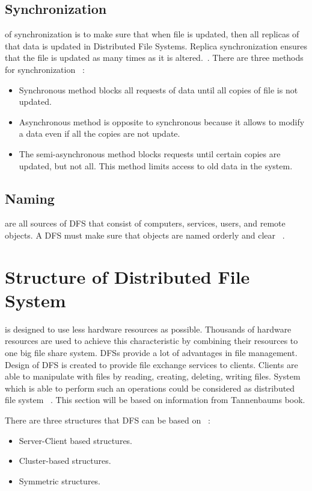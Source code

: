 \documentclass[a4paper,12pt,fleqn]{article}
\begin{document}
\subsection{Synchronization}

 of synchronization is to make sure that when file is updated, then all replicas of that data is updated in Distributed File Systems. Replica synchronization ensures that the file is updated as many times as it is altered.~\cite{vini2015novel}. There are three methods for synchronization ~\cite{depardon2013analysis}:
\begin{itemize}
\item Synchronous method blocks all requests of data until all copies of file is not updated.
\item Asynchronous method is opposite to synchronous because it allows to modify a data even if all the copies are not update.
\item The semi-asynchronous method blocks requests until certain copies are updated, but not all. This method limits access to old data in the system.
\end{itemize}

\subsection{Naming}

 are all sources of DFS that consist of computers, services, users, and remote objects. A DFS must make sure that objects are named orderly and clear ~\cite{levy1990distributed}.


\section{Structure of Distributed File System}

 is designed to use less hardware resources as possible. Thousands of hardware resources are used to achieve this characteristic by combining their resources to one big file share system. DFSs provide a lot of advantages in file management. Design of DFS is created to provide file exchange services to clients. Clients are able to manipulate with files by reading, creating, deleting, writing files. System which is able to perform such an operations could be considered as distributed file system ~\cite{levy1990distributed}. This section will be based on information from Tannenbaums book.
\bigskip

There are three structures that DFS can be based on ~\cite{tanenbaum2007distributed}: 
\begin{itemize}
\item Server-Client based structures.
\item Cluster-based structures.
\item Symmetric structures.
\end{itemize}
\end{document}
